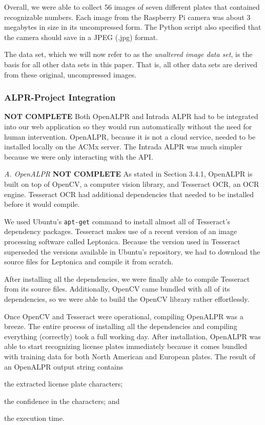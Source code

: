 \documentclass[11pt, oneside, fullpage, doublespace]{article}
\begin{document}
Overall, we were able to collect 56 images of seven different plates that contained recognizable numbers. Each image from the Raspberry Pi camera was about 3 megabytes in size in its uncompressed form. The Python script also specified that the camera should save in a JPEG (.jpg) format.

The data set, which we will now refer to as the \emph{unaltered image data set}, is the basis for all other data sets in this paper. That is, all other data sets are derived from these original, uncompressed images. 

\subsubsection{ALPR-Project Integration}
{\color{red}\textbf{NOT COMPLETE}}
Both OpenALPR and Intrada ALPR had to be integrated into our web application so they would run automatically without the need for human intervention. OpenALPR, because it is not a cloud service, needed to be installed locally on the ACMx server. The Intrada ALPR was much simpler because we were only interacting with the API.

\emph{A. OpenALPR}
{\color{red}\textbf{NOT COMPLETE}}
As stated in Section 3.4.1, OpenALPR is built on top of OpenCV, a computer vision library, and Tesseract OCR, an OCR engine. Tesseract OCR had additional dependencies that needed to be installed before it would compile.

We used Ubuntu's \verb+apt-get+ command to install almost all of Tesseract's dependency packages. Tesseract makes use of a recent version of an image processing software called Leptonica. Because the version used in Tesseract superseded the versions available in Ubuntu's repository, we had to download the source files for Leptonica and compile it from scratch.

After installing all the dependencies, we were finally able to compile Tesseract from its source files. Additionally, OpenCV came bundled with all of its dependencies, so we were able to build the OpenCV library rather effortlessly.

Once OpenCV and Tesseract were operational, compiling OpenALPR was a breeze. The entire process of installing all the dependencies and compiling everything (correctly) took a full working day. After installation, OpenALPR was able to start recognizing license plates immediately because it comes bundled with training data for both North American and European plates. The result of an OpenALPR output string contains
\begin{inparaenum}
\item the extracted license plate characters;
\item the confidence in the characters; and
\item the execution time.
\end{inparaenum}
\end{document}
